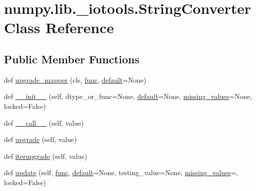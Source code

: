 \hypertarget{classnumpy_1_1lib_1_1__iotools_1_1StringConverter}{}\section{numpy.\+lib.\+\_\+iotools.\+String\+Converter Class Reference}
\label{classnumpy_1_1lib_1_1__iotools_1_1StringConverter}
\subsection*{Public Member Functions}
\begin{DoxyCompactItemize}
\item 
def \hyperlink{classnumpy_1_1lib_1_1__iotools_1_1StringConverter_abbd532192cd492cab583763380d132d6}{upgrade\+\_\+mapper} (cls, \hyperlink{classnumpy_1_1lib_1_1__iotools_1_1StringConverter_a407bb68d9cd86102fabf65b7618c12d9}{func}, \hyperlink{classnumpy_1_1lib_1_1__iotools_1_1StringConverter_af6eeab2aded49e13460876c37f4791f9}{default}=None)
\item 
def \hyperlink{classnumpy_1_1lib_1_1__iotools_1_1StringConverter_a7a2279b60a9eb15f924f4959258c53f7}{\+\_\+\+\_\+init\+\_\+\+\_\+} (self, dtype\+\_\+or\+\_\+func=None, \hyperlink{classnumpy_1_1lib_1_1__iotools_1_1StringConverter_af6eeab2aded49e13460876c37f4791f9}{default}=None, \hyperlink{classnumpy_1_1lib_1_1__iotools_1_1StringConverter_a52f3ad6c429500d77e0f111072b2de36}{missing\+\_\+values}=None, locked=False)
\item 
def \hyperlink{classnumpy_1_1lib_1_1__iotools_1_1StringConverter_a6760fec89a238d4a646f932deef522f2}{\+\_\+\+\_\+call\+\_\+\+\_\+} (self, value)
\item 
def \hyperlink{classnumpy_1_1lib_1_1__iotools_1_1StringConverter_aaa5ab95c04294d5c4fc113dc89a35475}{upgrade} (self, value)
\item 
def \hyperlink{classnumpy_1_1lib_1_1__iotools_1_1StringConverter_a9583734df1c8b1ae1f4fd45b32e5c246}{iterupgrade} (self, value)
\item 
def \hyperlink{classnumpy_1_1lib_1_1__iotools_1_1StringConverter_a55369b13d882ec205f7b66eafeda0a5a}{update} (self, \hyperlink{classnumpy_1_1lib_1_1__iotools_1_1StringConverter_a407bb68d9cd86102fabf65b7618c12d9}{func}, \hyperlink{classnumpy_1_1lib_1_1__iotools_1_1StringConverter_af6eeab2aded49e13460876c37f4791f9}{default}=None, testing\+\_\+value=None, \hyperlink{classnumpy_1_1lib_1_1__iotools_1_1StringConverter_a52f3ad6c429500d77e0f111072b2de36}{missing\+\_\+values}=\textquotesingle{}\textquotesingle{}, locked=False)
\end{DoxyCompactItemize}
